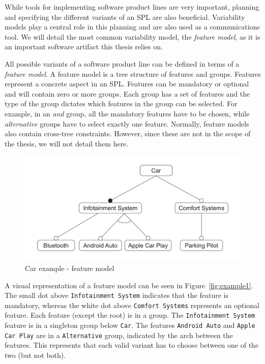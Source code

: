 \documentclass[a4paper,english]{ifimaster}
\begin{document}
While tools for implementing software product lines are very important, planning and specifying the different variants of an SPL are also beneficial. Variability models play a central role in this planning and are also used as a communications tool. We will detail the most common variability model, the \textit{feature model}, as it is an important software artifact this thesis relies on.

All possible variants of a software product line can be defined in terms of a \textit{feature model}. A feature model is a tree structure of features and groups. Features represent a concrete aspect in an SPL. Features can be mandatory or optional and will contain zero or more groups. Each group has a set of features and the type of the group dictates which features in the group can be selected. For example, in an \textit{and} group, all the mandatory features have to be chosen, while \textit{alternative} groups have to select exactly one feature. Normally, feature models also contain cross-tree constraints. However, since these are not in the scope of the thesis, we will not detail them here.

\begin{figure}[htpb]
	\centering
	\includegraphics[width=0.8\linewidth]{illustrations/example.pdf}
	\caption{Car example - feature model}%
	\label{fig:example1}
\end{figure}

A visual representation of a feature model can be seen in Figure~\vref{fig:example1}. The small dot above \texttt{Infotainment System} indicates that the feature is mandatory, whereas the white dot above \texttt{Comfort Systems} represents an optional feature. Each feature (except the root) is in a group. The \texttt{Infotainment System} feature is in a singleton group below \texttt{Car}. The features \texttt{Android Auto} and \texttt{Apple Car Play} are in a \texttt{Alternative} group, indicated by the arch between the features. This represents that each valid variant has to choose between one of the two (but not both).
\end{document}
